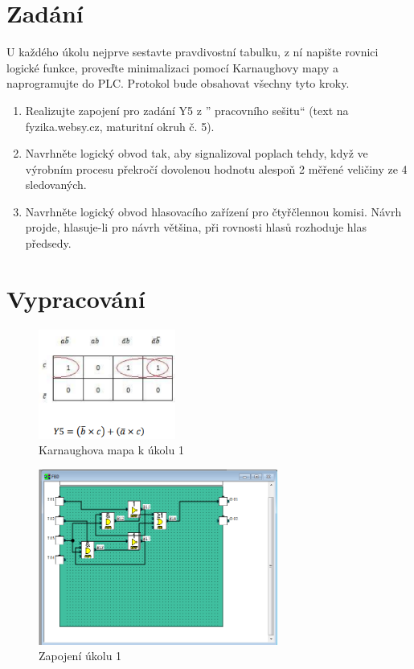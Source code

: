 \documentclass[12pt,a4paper]{article}
\begin{document}




\section*{Zadání}
U každého úkolu nejprve sestavte pravdivostní tabulku, z ní napište rovnici
logické funkce, proveďte minimalizaci pomocí Karnaughovy mapy a naprogramujte do PLC. Protokol bude obsahovat všechny tyto kroky.
\begin{enumerate}
	\item Realizujte zapojení pro zadání Y5 z ”
	pracovního sešitu“ (text na
	fyzika.websy.cz, maturitní okruh č. 5).
	\item  Navrhněte logický obvod tak, aby signalizoval poplach tehdy, když
	ve výrobním procesu překročí dovolenou hodnotu alespoň 2 měřené
	veličiny ze 4 sledovaných.
	\item Navrhněte logický obvod hlasovacího zařízení pro čtyřčlennou komisi.
	Návrh projde, hlasuje-li pro návrh většina, při rovnosti hlasů rozhoduje
	hlas předsedy.
\end{enumerate}

\section*{Vypracování}
\begin{figure}[H]
	\centering
	\includegraphics[width=0.4\textwidth]{priklad1.png}
	\caption{Karnaughova mapa k  úkolu 1}
\end{figure}
\begin{figure}[H]
	\centering
	\includegraphics[width=0.7\textwidth]{PLC_1.png}
	\caption{Zapojení úkolu 1}
	\label{fig:mesh1}
\end{figure}
\end{document}
